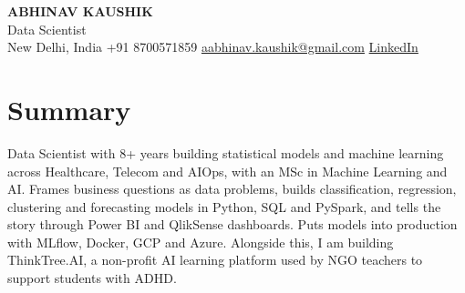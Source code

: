 \documentclass[10pt,a4paper]{article}
\begin{document}
\begin{center}
  {\LARGE\bfseries ABHINAV KAUSHIK}\\[2pt]
  {\large Data Scientist}\\[2pt]
  New Delhi, India \textbar{} +91 8700571859 \textbar{} \href{mailto:aabhinav.kaushik@gmail.com}{aabhinav.kaushik@gmail.com} \textbar{} \href{https://www.linkedin.com/in/abhinav-kaushik10/}{LinkedIn}  
\end{center}

\section{Summary}
Data Scientist with 8+ years building statistical models and machine learning across Healthcare, Telecom and AIOps, with an MSc in Machine Learning and AI. Frames business questions as data problems, builds classification, regression, clustering and forecasting models in Python, SQL and PySpark, and tells the story through Power BI and QlikSense dashboards. Puts models into production with MLflow, Docker, GCP and Azure. Alongside this, I am building ThinkTree.AI, a non-profit AI learning platform used by NGO teachers to support students with ADHD.
\end{document}
